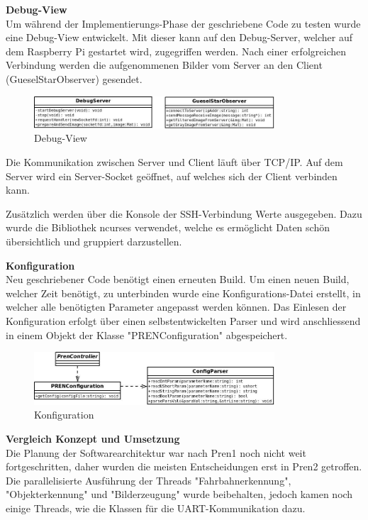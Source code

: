 \textbf{Debug-View}\\[0.2cm]
Um während der Implementierungs-Phase der geschriebene Code zu testen wurde eine Debug-View entwickelt. Mit dieser kann auf den Debug-Server, welcher auf dem Raspberry Pi gestartet wird, zugegriffen werden. Nach einer erfolgreichen Verbindung werden die aufgenommenen Bilder vom Server an den Client (GueselStarObserver) gesendet.

\begin{figure}[H]
\centering
\includegraphics[width=0.8\textwidth]{03_Loesungskonzept/pictures/DebugView.jpeg}
\caption{Debug-View}
\end{figure}

Die Kommunikation zwischen Server und Client läuft über TCP/IP. Auf dem Server wird ein Server-Socket geöffnet, auf welches sich der Client verbinden kann.

Zusätzlich werden über die Konsole der SSH-Verbindung Werte ausgegeben. Dazu wurde die Bibliothek ncurses verwendet, welche es ermöglicht Daten schön übersichtlich und gruppiert darzustellen.

\textbf{Konfiguration}\\[0.2cm]
Neu geschriebener Code benötigt einen erneuten Build. Um einen neuen Build, welcher Zeit benötigt, zu unterbinden wurde eine Konfigurations-Datei erstellt, in welcher alle benötigten Parameter angepasst werden können. Das Einlesen der Konfiguration erfolgt über einen selbstentwickelten Parser und wird anschliessend in einem Objekt der Klasse "PRENConfiguration" abgespeichert.

\begin{figure}[H]
\centering
\includegraphics[width=0.8\textwidth]{03_Loesungskonzept/pictures/Configuration.jpeg}
\caption{Konfiguration}
\end{figure}

\textbf{Vergleich Konzept und Umsetzung}\\[0.2cm]
Die Planung der Softwarearchitektur war nach Pren1 noch nicht weit fortgeschritten, daher wurden die meisten Entscheidungen erst in Pren2 getroffen. Die parallelisierte Ausführung der Threads "{}Fahrbahnerkennung"{}, "{}Objekterkennung"{} und "{}Bilderzeugung"{} wurde beibehalten, jedoch kamen noch einige Threads, wie die Klassen für die UART-Kommunikation dazu.
 
